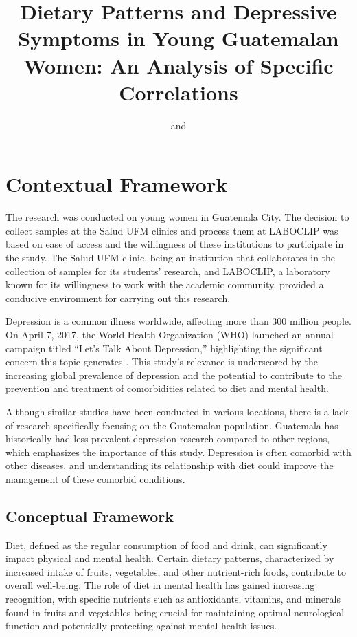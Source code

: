 \documentclass[jou]{apa7}
\title{Dietary Patterns and Depressive Symptoms in Young Guatemalan Women: An Analysis of Specific Correlations}
\author{
	\addORCIDlink{Camila Heredia, M.D.}{0009-0008-9550-9083} and \addORCIDlink{Lic. María Andrée Neumann}{0009-0001-2531-6058}
}
\begin{document}
	\maketitle



	\section{Contextual Framework}\label{marco-contextual}

	The research was conducted on young women in Guatemala City. The decision to collect samples at the Salud UFM clinics and process them at LABOCLIP was based on ease of access and the willingness of these institutions to participate in the study. The Salud UFM clinic, being an institution that collaborates in the collection of samples for its students' research, and LABOCLIP, a laboratory known for its willingness to work with the academic community, provided a conducive environment for carrying out this research.

	Depression is a common illness worldwide, affecting more than 300 million people. On April 7, 2017, the World Health Organization (WHO) launched an annual campaign titled ``Let's Talk About Depression,'' highlighting the significant concern this topic generates \parencite{Toshi2022}. This study's relevance is underscored by the increasing global prevalence of depression and the potential to contribute to the prevention and treatment of comorbidities related to diet and mental health.

	Although similar studies have been conducted in various locations, there is a lack of research specifically focusing on the Guatemalan population. Guatemala has historically had less prevalent depression research compared to other regions, which emphasizes the importance of this study. Depression is often comorbid with other diseases, and understanding its relationship with diet could improve the management of these comorbid conditions.

	\subsection{Conceptual Framework}

	Diet, defined as the regular consumption of food and drink, can significantly impact physical and mental health. Certain dietary patterns, characterized by increased intake of fruits, vegetables, and other nutrient-rich foods, contribute to overall well-being. The role of diet in mental health has gained increasing recognition, with specific nutrients such as antioxidants, vitamins, and minerals found in fruits and vegetables being crucial for maintaining optimal neurological function and potentially protecting against mental health issues.
\end{document}
